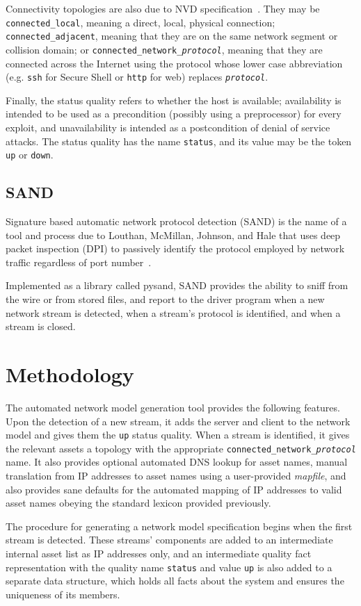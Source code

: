 \documentclass{article}
\begin{document}
Connectivity topologies are also due to NVD specification~\cite{nvdhome}. They
may be \texttt{connected\_local}, meaning a direct, local, physical connection;
\texttt{connected\_adjacent}, meaning that they are on the same network segment
or collision domain; or \texttt{connected\_network\_\textit{protocol}}, meaning
that they are connected across the Internet using the protocol whose lower case
abbreviation (e.g. \texttt{ssh} for Secure Shell or 
\texttt{http} for web) replaces \texttt{\textit{protocol}}.

Finally, the status quality refers to whether the host is available; 
availability is intended to be used as a precondition (possibly using a 
preprocessor) for every exploit, and unavailability is intended as a 
postcondition of denial of service attacks. The status quality has the name
\texttt{status}, and its value may be the token \texttt{up} or \texttt{down}.
\subsection{SAND}
Signature based automatic network protocol detection (SAND) is the name of
a tool and process due to Louthan, McMillan, Johnson, and Hale that uses
deep packet inspection (DPI) to passively identify the protocol employed by
network traffic regardless of port number~\cite{louthan2009toward}.

Implemented as a library called pysand, SAND provides the ability to sniff
from the wire or from stored files, and report to the driver program when
a new network stream is detected, when a stream's protocol is identified,
and when a stream is closed.
\section{Methodology}
The automated network model generation tool provides the following features.
Upon the detection of a new stream, it adds the server and client to the
network model and gives them the \texttt{up} status quality. When a stream
is identified, it gives the relevant assets a topology with the 
appropriate \texttt{connected\_network\_\textit{protocol}} name. It also
provides optional automated DNS lookup for asset names, manual translation from
IP addresses to asset names using a user-provided \emph{mapfile}, and also
provides sane defaults for the automated mapping of IP addresses to
valid asset names obeying the standard lexicon provided previously.

The procedure for generating a network model specification begins when the first
stream is detected. These streams' components are added to an intermediate
internal asset list as IP addresses only, and an intermediate quality fact
representation with the quality name \texttt{status} and value \texttt{up} is
also added to a separate data structure, which holds all
facts about the system and ensures the uniqueness of its
members.
\end{document}
